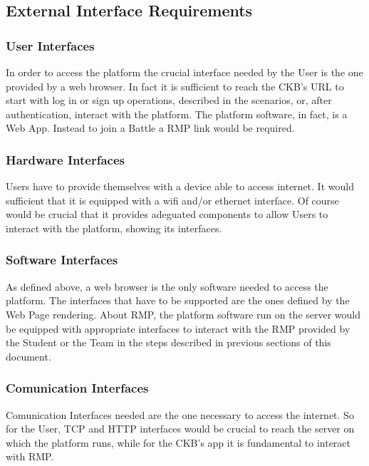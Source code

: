 
\subsection{External Interface Requirements}

\subsubsection{User Interfaces}
In order to access the platform the crucial interface needed by the User is the one provided by a web browser. In fact it is sufficient to reach the CKB's URL to start with log in or sign up operations, described in the scenarios, or, after authentication, interact with the platform. The platform software, in fact, is a Web App. Instead to join a Battle a RMP link would be required.
\subsubsection{Hardware Interfaces}
Users have to provide themselves with a device able to access internet. It would sufficient that it is equipped with a wifi and/or ethernet interface. Of course would be crucial that it provides adeguated components to allow Users to interact with the platform, showing its interfaces.
\subsubsection{Software Interfaces}
As defined above, a web browser is the only software needed to access the platform. The interfaces that have to be supported are the ones defined by the Web Page rendering. About RMP, the platform software run on the server would be equipped with appropriate interfaces to interact with the RMP provided by the Student or the Team in the steps described in previous sections of this document.
\subsubsection{Comunication Interfaces}
Comunication Interfaces needed are the one necessary to access the internet. So for the User, TCP and HTTP interfaces would be crucial to reach the server on which the platform runs, while for the CKB's app it is fundamental to interact with RMP.


